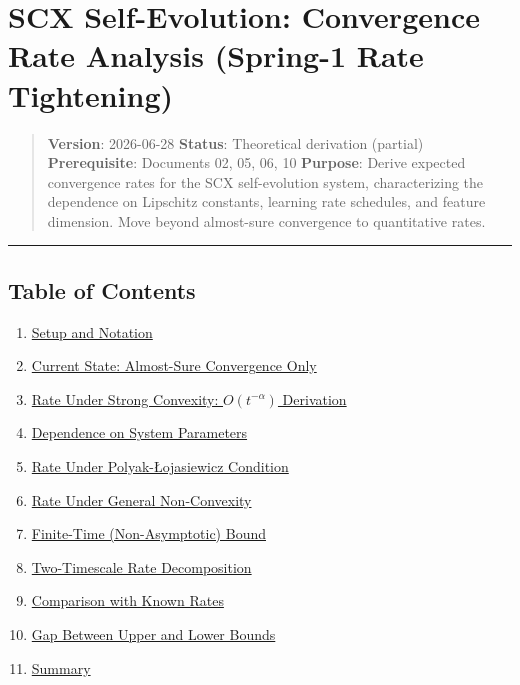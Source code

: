 \documentclass[
  12pt,
]{article}
\author{SCX}
\date{2026}
\providecommand{\tightlist}{%
  \setlength{\itemsep}{0pt}\setlength{\parskip}{0pt}}
\begin{document}
\section{SCX Self-Evolution: Convergence Rate Analysis (Spring-1 Rate
Tightening)}\label{scx-self-evolution-convergence-rate-analysis-spring-1-rate-tightening}

\begin{quote}
\textbf{Version}: 2026-06-28 \textbar{} \textbf{Status}: Theoretical
derivation (partial) \textbar{} \textbf{Prerequisite}: Documents 02, 05,
06, 10 \textbf{Purpose}: Derive expected convergence rates for the SCX
self-evolution system, characterizing the dependence on Lipschitz
constants, learning rate schedules, and feature dimension. Move beyond
almost-sure convergence to quantitative rates.
\end{quote}

\begin{center}\rule{0.5\linewidth}{0.5pt}\end{center}

\subsection{Table of Contents}\label{table-of-contents}

\begin{enumerate}
\def\labelenumi{\arabic{enumi}.}
\tightlist
\item
  \hyperref[1-setup-and-notation]{Setup and Notation}
\item
  \hyperref[2-current-state-almost-sure-convergence-only]{Current State:
  Almost-Sure Convergence Only}
\item
  \hyperref[3-rate-under-strong-convexity-ot-alpha-derivation]{Rate
  Under Strong Convexity: \(O(t^{-\alpha})\) Derivation}
\item
  \hyperref[4-dependence-on-system-parameters]{Dependence on System
  Parameters}
\item
  \hyperref[5-rate-under-polyak-lojasiewicz-condition]{Rate Under
  Polyak-Łojasiewicz Condition}
\item
  \hyperref[6-rate-under-general-non-convexity]{Rate Under General
  Non-Convexity}
\item
  \hyperref[7-finite-time-non-asymptotic-bound]{Finite-Time
  (Non-Asymptotic) Bound}
\item
  \hyperref[8-two-timescale-rate-decomposition]{Two-Timescale Rate
  Decomposition}
\item
  \hyperref[9-comparison-with-known-rates]{Comparison with Known Rates}
\item
  \hyperref[10-gap-between-upper-and-lower-bounds]{Gap Between Upper and
  Lower Bounds}
\item
  \hyperref[11-summary]{Summary}
\end{enumerate}
\end{document}
